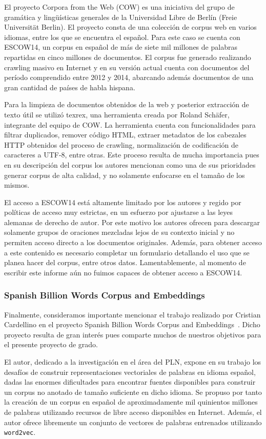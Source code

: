 El proyecto Corpora from the Web (COW) es una iniciativa del grupo de gramática y lingüísticas
generales de la Universidad Libre de Berlín (Freie Universität Berlin). El proyecto consta de una
colección de corpus web en varios idiomas, entre los que se encuentra el español. Para este caso se
cuenta con ESCOW14, un corpus en español de más de siete mil millones de palabras repartidas en
cinco millones de documentos. El corpus fue generado realizando crawling masivo en Internet y en su
versión actual cuenta con documentos del período comprendido entre 2012 y 2014, abarcando además
documentos de una gran cantidad de países de habla hispana.

Para la limpieza de documentos obtenidos de la web y posterior extracción de texto útil se utilizó
texrex, una herramienta creada por Roland Schäfer, integrante del equipo de COW. La herramienta cuenta
con funcionalidades para filtrar duplicados, remover código HTML, extraer metadatos de los cabezales
HTTP obtenidos del proceso de crawling, normalización de codificación de caracteres a UTF-8, entre
otras. Este proceso resulta de mucha importancia pues en su descripción del corpus los autores
mencionan como una de sus prioridades generar corpus de alta calidad, y no solamente enfocarse en el
tamaño de los mismos.

El acceso a ESCOW14 está altamente limitado por los autores y regido por políticas de acceso muy
estrictas, en un esfuerzo por ajustarse a las leyes alemanas de derecho de autor. Por este motivo
los autores ofrecen para descargar solamente grupos de oraciones mezcladas lejos de su contexto inicial
y no permiten acceso directo a los documentos originales. Además, para obtener acceso a este contenido
es necesario completar un formulario detallando el uso que se planea hacer del corpus, entre otros
datos. Lamentablemente, al momento de escribir este informe aún no fuimos capaces de obtener acceso
a ESCOW14.

\subsubsection{Spanish Billion Words Corpus and Embeddings}

Finalmente, consideramos importante mencionar el trabajo realizado por Cristian Cardellino en el proyecto
Spanish Billion Words Corpus and Embeddings~\cite{SBWCE}. Dicho proyecto resulta de gran interés pues
comparte muchos de nuestros objetivos para el presente proyecto de grado.

El autor, dedicado a la investigación en el área del PLN, expone en su trabajo los desafíos de construir
representaciones vectoriales de palabras en idioma español, dadas las enormes dificultades para encontrar
fuentes disponibles para construir un corpus no anotado de tamaño suficiente en dicho idioma. Se propuso
por tanto la creación de un corpus en español de aproximadamente mil quinientos millones de palabras
utilizando recursos de libre acceso disponibles en Internet. Además, el autor ofrece libremente un
conjunto de vectores de palabras entrenados utilizando \texttt{word2vec}.

